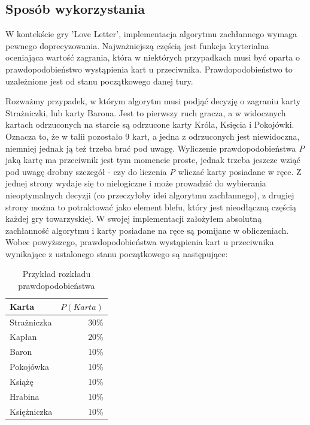\subsection{Sposób wykorzystania}

W kontekście gry 'Love Letter', implementacja algorytmu zachłannego wymaga pewnego doprecyzowania. Najważniejszą częścią jest funkcja kryterialna oceniająca wartość zagrania, która w niektórych przypadkach musi być oparta o prawdopodobieństwo wystąpienia kart u przeciwnika. Prawdopodobieństwo to uzależnione jest od stanu początkowego danej tury.

Rozważmy przypadek, w którym algorytm musi podjąć decyzję o zagraniu karty Strażniczki, lub karty Barona. Jest to pierwszy ruch gracza, a w widocznych kartach odrzuconych na starcie są odrzucone karty Króla, Księcia i Pokojówki. Oznacza to, że w talii pozostało 9 kart, a jedna z odrzuconych jest niewidoczna, niemniej jednak ją też trzeba brać pod uwagę. Wyliczenie prawdopodobieństwa \textit{P} jaką kartę ma przeciwnik jest tym momencie proste, jednak trzeba jeszcze wziąć pod uwagę drobny szczegół - czy do liczenia \textit{P} wliczać karty posiadane w ręce. Z jednej strony wydaje się to nielogiczne i może prowadzić do wybierania nieoptymalnych decyzji (co przeczyłoby idei algorytmu zachłannego), z drugiej strony można to potraktować jako element blefu, który jest nieodłączną częścią każdej gry towarzyskiej. W swojej implementacji założyłem absolutną zachłanność algorytmu i karty posiadane na ręce są pomijane w obliczeniach. 
Wobec powyższego, prawdopodobieństwa wystąpienia kart u przeciwnika wynikające z ustalonego stanu początkowego są następujące:

\begin{table}[h]
	\caption{Przykład rozkładu prawdopodobieństwa}
	\centering
		\begin{tabular}{|l|r|}
			\hline
			\bf{Karta} & $P(Karta)$	\\ \hline
			Strażniczka & 30\% 			\\ \hline
			Kapłan & 20\% 				\\ \hline
			Baron & 10\% 				\\ \hline
			Pokojówka & 10\% 			\\ \hline
			Książę & 10\% 				\\ \hline
			Hrabina & 10\% 				\\ \hline
			Księżniczka & 10\% 			\\ \hline
		\end{tabular}
\end{table}

